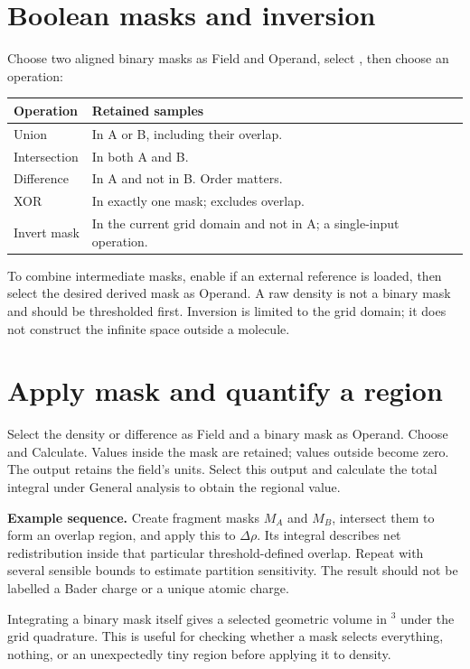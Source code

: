 \section{Boolean masks and inversion}
Choose two aligned binary masks as Field and Operand, select , then choose an operation:
\begin{longtable}{p{.22\linewidth}p{.69\linewidth}}
\toprule Operation & Retained samples \\ \midrule\endhead
Union & In A or B, including their overlap. \\
Intersection & In both A and B. \\
Difference & In A and not in B. Order matters. \\
XOR & In exactly one mask; excludes overlap. \\
Invert mask & In the current grid domain and not in A; a single-input operation. \\
\bottomrule
\end{longtable}
To combine intermediate masks, enable  if an external reference is loaded, then select the desired derived mask as Operand. A raw density is not a binary mask and should be thresholded first. Inversion is limited to the grid domain; it does not construct the infinite space outside a molecule.

\section{Apply mask and quantify a region}
Select the density or difference as Field and a binary mask as Operand. Choose  and Calculate. Values inside the mask are retained; values outside become zero. The output retains the field's units. Select this output and calculate the total integral under General analysis to obtain the regional value.

\textbf{Example sequence.} Create fragment masks $M_A$ and $M_B$, intersect them to form an overlap region, and apply this to $\Delta\rho$. Its integral describes net redistribution inside that particular threshold-defined overlap. Repeat with several sensible bounds to estimate partition sensitivity. The result should not be labelled a Bader charge or a unique atomic charge.

Integrating a binary mask itself gives a selected geometric volume in \angstrom$^3$ under the grid quadrature. This is useful for checking whether a mask selects everything, nothing, or an unexpectedly tiny region before applying it to density.

